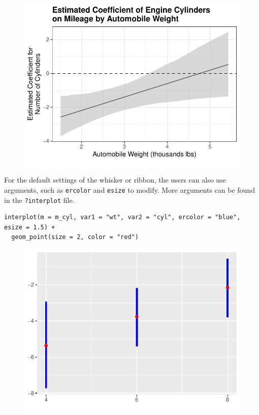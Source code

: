 \documentclass[
  article]{jss}
\begin{document}
\begin{figure}[H]

{\centering \includegraphics{jss_manuscript_files/figure-pdf/unnamed-chunk-7-1.pdf}

}

\end{figure}

For the default settings of the whisker or ribbon, the users can also
use arguments, such as \texttt{ercolor} and \texttt{esize} to modify.
More arguments can be found in the \texttt{?interplot} file.

\begin{verbatim}
interplot(m = m_cyl, var1 = "wt", var2 = "cyl", ercolor = "blue", esize = 1.5) +
  geom_point(size = 2, color = "red")
\end{verbatim}

\begin{figure}[H]

{\centering \includegraphics{jss_manuscript_files/figure-pdf/unnamed-chunk-8-1.pdf}

}

\end{figure}
\end{document}
